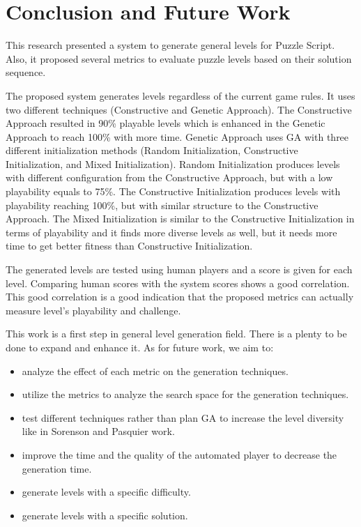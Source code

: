 \documentclass[letterpaper]{article}
\begin{document}
\section{Conclusion and Future Work}
This research presented a system to generate general levels for Puzzle Script. Also, it proposed several metrics to evaluate puzzle levels based on their solution sequence.\\\par

The proposed system generates levels regardless of the current game rules. It uses two different techniques (Constructive and Genetic Approach). The Constructive Approach resulted in 90\% playable levels which is enhanced in the Genetic Approach to reach 100\% with more time. Genetic Approach uses GA with three different initialization methods (Random Initialization, Constructive Initialization, and Mixed Initialization). Random Initialization produces levels with different configuration from the Constructive Approach, but with a low playability equals to 75\%.  The Constructive Initialization produces levels with playability reaching 100\%, but with similar structure to the Constructive Approach. The Mixed Initialization is similar to the Constructive Initialization in terms of playability and it finds more diverse levels as well, but it needs more time to get better fitness than Constructive Initialization.\\\par

The generated levels are tested using human players and a score is given for each level. Comparing human scores with the system scores shows a good correlation. This good correlation is a good indication that the proposed metrics can actually measure level's playability and challenge.\\\par

This work is a first step in general level generation field. There is a plenty to be done to expand and enhance it. As for future work, we aim to:
\begin{itemize}
	\item analyze the effect of each metric on the generation techniques.
	\item utilize the metrics to analyze the search space for the generation techniques.
	\item test different techniques rather than plan GA to increase the level diversity like in Sorenson and Pasquier work\cite{genericLevelFramework}.
	\item improve the time and the quality of the automated player to decrease the generation time.
	\item generate levels with a specific difficulty.
	\item generate levels with a specific solution.
\end{itemize}
\end{document}
